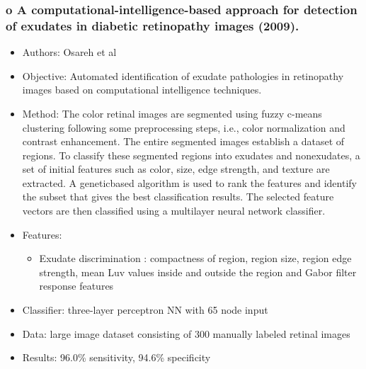 \documentclass[12pt]{report}
\begin{document}
\subsubsection{o	A computational-intelligence-based approach for detection of exudates in diabetic retinopathy images (2009). \cite{osareh2009computational}}
\begin{itemize}
\item Authors: Osareh et al
\item Objective: Automated identification of exudate pathologies in retinopathy images based on computational intelligence techniques.
\item Method: The color retinal images are segmented using fuzzy c-means clustering following some preprocessing steps, i.e., color normalization and contrast enhancement. The entire segmented images establish a dataset of regions. To classify these segmented regions into exudates and nonexudates, a set of initial features such as color, size, edge strength, and texture are extracted. A geneticbased algorithm is used to rank the features and identify the subset that gives the best classification results. The selected feature vectors are then classified using a multilayer neural network classifier.
\item Features:
\begin{itemize}
\item Exudate discrimination : compactness of region, region size, region edge strength, mean Luv values inside and outside the region and Gabor filter response features
\end{itemize}
\item Classifier: three-layer perceptron NN with 65 node input
\item Data: large image dataset consisting of 300 manually labeled retinal images
\item Results: 96.0\% sensitivity, 94.6\% specificity
\end{itemize}
\end{document}
